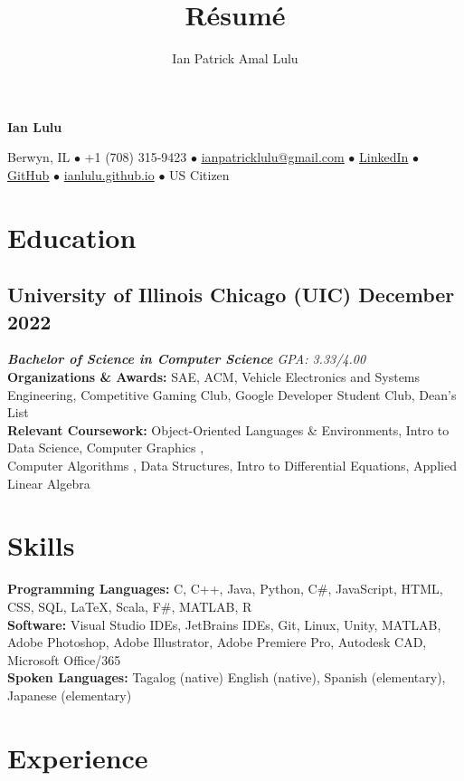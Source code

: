 \documentclass{article}
\makeatletter
\renewcommand{\maketitle}{
    \begin{center}
    {\bfseries\huge
    Ian Lulu}
    
    \vspace{0.25em}

    Berwyn, IL {$\bullet$} +1 (708) 315-9423 {$\bullet$} \href{mailto:ianpatricklulu@gmail.com}{\underline{ianpatricklulu@gmail.com}} {$\bullet$} \href{https://www.linkedin.com/in/ianlulu/}{\underline{LinkedIn}} {$\bullet$} \href{https://github.com/IanLulu}{\underline{GitHub}} {$\bullet$} \url{ianlulu.github.io}
    {$\bullet$} US Citizen
    
    \end{center}
}
\newcommand{\RomanNumeralCaps}[1]
    {\MakeUppercase{\romannumeral #1}}
\makeatother
\begin{document}
\title{R\'esum\'e}
\author{Ian Patrick Amal Lulu}


\maketitle
{} %


\section{Education}
\subsection{University of Illinois Chicago (UIC) \hfill \textnormal{December 2022}}
\vspace{-0.5em}
\textit{\textbf{Bachelor of Science in Computer Science} \hfill GPA: 3.33/4.00}
\\ %
\textbf{Organizations \& Awards:} SAE, ACM, Vehicle Electronics and Systems Engineering, Competitive Gaming Club, Google Developer Student Club, Dean's List
\\
\textbf{Relevant Coursework:} Object-Oriented Languages \& Environments, Intro to Data Science, Computer Graphics \RomanNumeralCaps{1}, \\ 
Computer Algorithms \RomanNumeralCaps{1}, Data Structures, Intro to Differential Equations, Applied Linear Algebra


\section{Skills}
\textbf{Programming Languages:} C, C++, Java, Python, C\#, JavaScript, HTML, CSS, SQL, {\LaTeX}, Scala, F\#, MATLAB, R
\\
\textbf{Software:} Visual Studio IDEs, JetBrains IDEs, Git, Linux, Unity, MATLAB, Adobe Photoshop, Adobe Illustrator, Adobe Premiere Pro, Autodesk CAD, Microsoft Office/365
\\
\textbf{Spoken Languages:} Tagalog (native) English (native), Spanish (elementary), Japanese (elementary)


\section{Experience}
\end{document}
